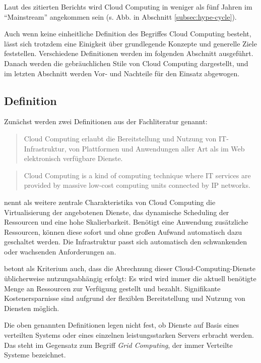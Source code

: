 Laut des zitierten Berichts wird Cloud Computing in weniger als fünf Jahren im \enquote{Mainstream} angekommen sein (s. Abb. in Abschnitt \ref{subsec:hype-cycle}).

Auch wenn keine einheitliche Definition des Begriffes Cloud Computing besteht, lässt sich trotzdem eine Einigkeit über grundlegende Konzepte und generelle Ziele feststellen. Verschiedene Definitionen werden im folgenden Abschnitt ausgeführt. Danach werden die gebräuchlichen Stile von Cloud Computing dargestellt, und im letzten Abschnitt werden Vor- und Nachteile für den Einsatz abgewogen.


\subsection{Definition}

Zunächst werden zwei Definitionen aus der Fachliteratur genannt:

\begin{quote}
Cloud Computing erlaubt die Bereitstellung und Nutzung von IT-Infrastruktur, von Plattformen und Anwendungen aller Art als im Web elektronisch verfügbare Dienste. 
\end{quote}
 
\begin{quote}
Cloud Computing is a kind of computing technique where IT services are provided by massive low-cost computing units connected by IP networks. 
\end{quote}


 nennt als weitere zentrale Charakteristika von Cloud Computing die Virtualisierung der angebotenen Dienste, das dynamische Scheduling der Ressourcen und eine hohe Skalierbarkeit. Benötigt eine Anwendung zusätzliche Ressourcen, können diese sofort und ohne großen Aufwand automatisch dazu geschaltet werden. Die Infrastruktur passt sich automatisch den schwankenden oder wachsenden Anforderungen an.

 betont als Kriterium auch, dass die Abrechnung dieser Cloud-Computing-Dienste üblicherweise nutzungsabhängig erfolgt: Es wird wird immer die aktuell benötigte Menge an Ressourcen zur Verfügung gestellt und bezahlt. Signifikante Kostenersparnisse sind aufgrund der flexiblen Bereitstellung und Nutzung von Diensten möglich. 
 
Die oben genannten Definitionen legen nicht fest, ob Dienste auf Basis eines verteilten Systems oder eines einzelnen leistungsstarken Servers erbracht werden. Das steht im Gegensatz zum Begriff \textit{Grid Computing}, der immer Verteilte Systeme bezeichnet.


